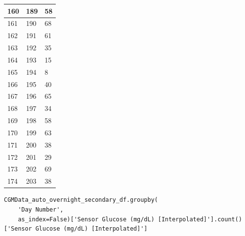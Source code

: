 \begin{tabular}{p{}p{}p{}}
\hline
160 & 189 & 58 \\
\hline
161 & 190 & 68 \\
\hline
162 & 191 & 61 \\
\hline
163 & 192 & 35 \\
\hline
164 & 193 & 15 \\
\hline
165 & 194 & 8 \\
\hline
166 & 195 & 40 \\
\hline
167 & 196 & 65 \\
\hline
168 & 197 & 34 \\
\hline
169 & 198 & 58 \\
\hline
170 & 199 & 63 \\
\hline
171 & 200 & 38 \\
\hline
172 & 201 & 29 \\
\hline
173 & 202 & 69 \\
\hline
174 & 203 & 38 \\
\hline
\bottomrule
\end{tabular}

\bigskip

\begin{verbatim}
CGMData_auto_overnight_secondary_df.groupby(
    'Day Number', 
    as_index=False)['Sensor Glucose (mg/dL) [Interpolated]'].count()['Sensor Glucose (mg/dL) [Interpolated]']
\end{verbatim}


